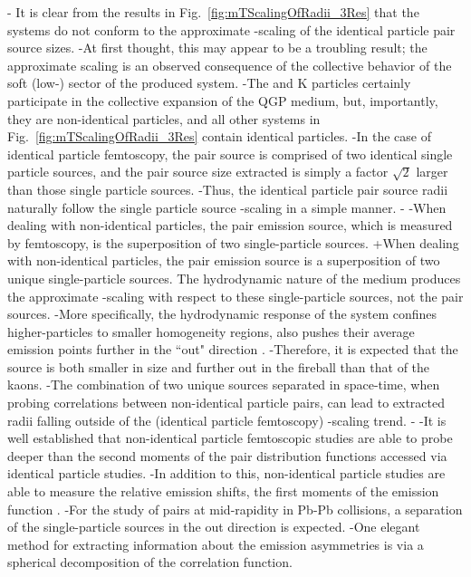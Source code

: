 -
 It is clear from the results in Fig.\ \ref{fig:mTScalingOfRadii_3Res} that the \LamK systems do not conform to the approximate \mt-scaling of the identical particle pair source sizes.
-At first thought, this may appear to be a troubling result; the approximate scaling is an observed consequence of the collective behavior of the soft (low-\pt) sector of the produced system.
-The \Lam and K particles certainly participate in the collective expansion of the QGP medium, but, importantly, they are non-identical particles, and all other systems in Fig.\ \ref{fig:mTScalingOfRadii_3Res} contain identical particles.
-In the case of identical particle femtoscopy, the pair source is comprised of two identical single particle sources, and the pair source size extracted is simply a factor $\sqrt{2}$ larger than those single particle sources.
-Thus, the identical particle pair source radii naturally follow the single particle source \mt-scaling in a simple manner.
-
-When dealing with non-identical particles, the pair emission source, which is measured by femtoscopy, is the superposition of two single-particle sources.
+When dealing with non-identical particles, the pair emission source is a superposition of two unique single-particle sources.
 The hydrodynamic nature of the medium produces the approximate \mt-scaling with respect to these single-particle sources, not the pair sources.
-More specifically, the hydrodynamic response of the system confines higher-\mt particles to smaller homogeneity regions, also pushes their average emission points further in the ``out" direction \cite{Retiere:2003kf}.
-Therefore, it is expected that the \Lam source is both smaller in size and further out in the fireball than that of the kaons.
-The combination of two unique sources separated in space-time, when probing correlations between non-identical particle pairs, can lead to extracted radii falling outside of the (identical particle femtoscopy) \mt-scaling trend.
-
-It is well established that non-identical particle femtoscopic studies are able to probe deeper than the second moments of the pair distribution functions accessed via identical particle studies.
-In addition to this, non-identical particle studies are able to measure the relative emission shifts, the first moments of the emission function \cite{Kisiel:2009eh}.
-For the study of \LamK pairs at mid-rapidity in Pb-Pb collisions, a separation of the single-particle sources in the out direction is expected.
-One elegant method for extracting information about the emission asymmetries is via a spherical decomposition of the correlation function.
